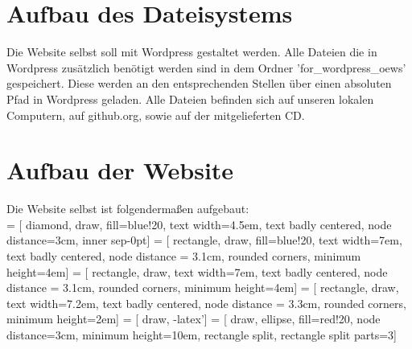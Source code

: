 \documentclass[11pt,a4paper,titlepage]{article}
\theoremstyle{plain} %
\theoremstyle{definition} %
\numberwithin{equation}{section} %
\begin{document}
	\section{Aufbau des Dateisystems}
	Die Website selbst soll mit Wordpress gestaltet werden. Alle Dateien die in Wordpress zusätzlich benötigt werden sind in dem Ordner 'for\_wordpress\_oews' gespeichert. Diese werden an den entsprechenden Stellen über einen absoluten Pfad in Wordpress geladen. Alle Dateien befinden sich auf unseren lokalen Computern, auf github.org, sowie auf der mitgelieferten CD.
	
	\section{Aufbau der Website}
	Die Website selbst ist folgendermaßen aufgebaut: \\
	
		 = [ diamond, draw, fill=blue!20, text width=4.5em, text badly centered, node distance=3cm, inner sep-0pt]  
		 = [ rectangle, draw, fill=blue!20, text width=7em, text badly centered, node distance = 3.1cm, rounded corners, minimum height=4em]
		 = [ rectangle, draw, text width=7em, text badly centered, node distance = 3.1cm, rounded corners, minimum height=4em]    
		 = [ rectangle, draw, text width=7.2em, text badly centered, node distance = 3.3cm, rounded corners, minimum height=2em]  
		 = [ draw, -latex']  
		 = [ draw, ellipse, fill=red!20, node distance=3cm, minimum height=10em, rectangle split, rectangle split parts=3]  
		
\end{document}
